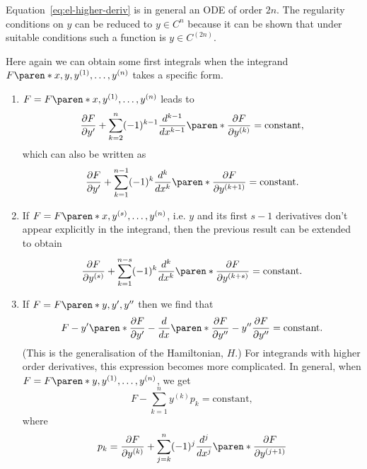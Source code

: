 \documentclass[11pt]{penrose}
\begin{document}
Equation~\eqref{eq:el-higher-deriv} is in general an ODE of order $2n$. The regularity conditions on $y$ can be reduced to $y \in C^n$ because it can be shown that under suitable conditions such a function is $y \in C^{(2n)}$.

Here again we can obtain some first integrals when the integrand $F\paren*{x, y, y^{(1)}, \dots, y^{(n)}}$ takes a specific form.
\begin{enumerate}
    \item $F = F\paren*{x, y^{(1)}, \dots, y^{(n)}}$ leads to
    \begin{equation}
        \frac{\pd F}{\pd y'} + \sum_{k=2}^{n} (-1)^{k-1} \frac{d^{k-1}}{dx^{k-1}} \paren*{\frac{\pd F}{\pd y^{(k)}}}
        = \text{constant},
    \end{equation}
    which can also be written as
    \begin{equation}
        \frac{\pd F}{\pd y'} + \sum_{k=1}^{n-1} (-1)^{k} \frac{d^{k}}{dx^{k}} \paren*{\frac{\pd F}{\pd y^{(k+1)}}}
        = \text{constant}.
    \end{equation}

    \item If $F = F\paren*{x, y^{(s)}, \dots, y^{(n)}}$, i.e. $y$ and its first $s-1$ derivatives don't appear explicitly in the integrand, then the previous result can be extended to obtain
    \begin{equation}
        \frac{\pd F}{\pd y^{(s)}}
        + \sum_{k=1}^{n-s} (-1)^{k} \frac{d^{k}}{dx^{k}} \paren*{\frac{\pd F}{\pd y^{(k+s)}}}
        = \text{constant}.
    \end{equation}

    \item If $F = F\paren*{y, y', y''}$ then we find that
    \begin{equation}
        F - y' \paren*{\frac{\pd F}{\pd y'} - \frac{d}{dx}\paren*{\frac{\pd F}{\pd y''}}} - y'' \frac{\pd F}{\pd y''}
        = \text{constant}.
    \end{equation}
    (This is the generalisation of the Hamiltonian, $H$.) For integrands with higher order derivatives, this expression becomes more complicated. In general, when $F = F\paren*{y, y^{(1)}, \dots, y^{(n)}}$, we get
    \begin{equation}
        F - \sum_{k=1}^{n} y^{(k)} p_{k} = \text{constant},
    \end{equation}
    where
    \begin{equation}
        p_k = \frac{\pd F}{\pd y^{(k)}}
        + \sum_{j=k}^{n} (-1)^{j} \frac{d^{j}}{dx^{j}} \paren*{ \frac{\pd F}{\pd y^{(j+1)}} }
    \end{equation}
\end{enumerate}
\end{document}

